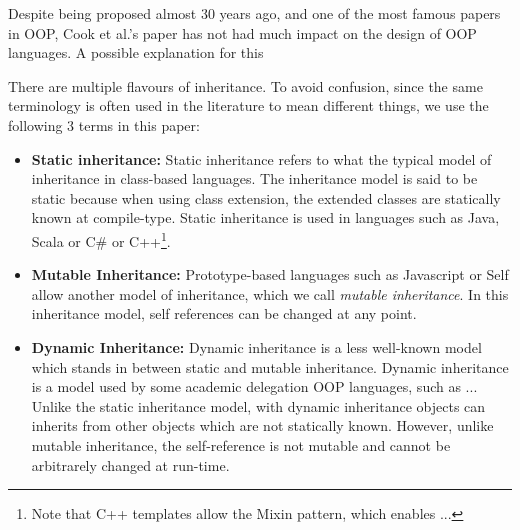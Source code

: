 Despite being proposed almost 30 years ago, and one of the most
famous papers in OOP, Cook et al.'s paper has not had much impact 
on the design of OOP languages. A possible explanation for this 


There are multiple flavours of inheritance. To avoid confusion, since 
the same terminology is often used in the literature to mean different 
things, we use the following 3 terms in this paper:

\begin{itemize}



\item{{\bf Static inheritance:}} Static inheritance refers to what the
  typical model of inheritance in class-based languages. The
  inheritance model is said to be static because when using class
  extension, the extended classes are statically known at compile-type.
Static inheritance is used in languages such as Java, Scala or C\# or
C++\footnote{Note that C++ templates allow the Mixin pattern, which
  enables ...}.

\item{{\bf Mutable Inheritance:}} Prototype-based languages such as 
Javascript or Self allow another model of inheritance, which we call
\emph{mutable inheritance}. In this inheritance model, self references 
can be changed at any point. 

\item{{\bf Dynamic Inheritance:}} Dynamic inheritance is a less well-known 
model which stands in between static and mutable inheritance.
Dynamic inheritance is a model used by some academic delegation 
OOP languages, such as ...  
Unlike the static inheritance model, with dynamic inheritance 
objects can inherits from other objects which are not statically
known. However, unlike mutable inheritance, the self-reference is not 
mutable and cannot be arbitrarely changed at run-time. 

\end{itemize}

